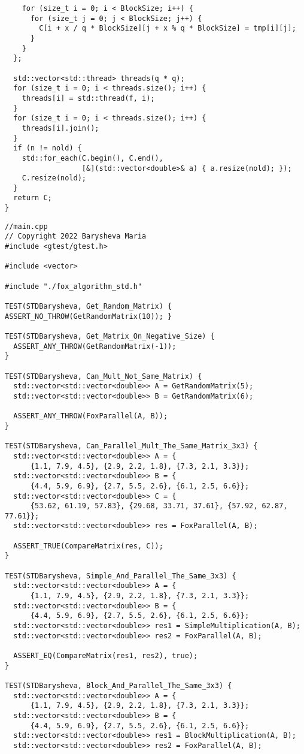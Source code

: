 \documentclass[12pt]{article}
\begin{document}
\begin{lstlisting}
    for (size_t i = 0; i < BlockSize; i++) {
      for (size_t j = 0; j < BlockSize; j++) {
        C[i + x / q * BlockSize][j + x % q * BlockSize] = tmp[i][j];
      }
    }
  };

  std::vector<std::thread> threads(q * q);
  for (size_t i = 0; i < threads.size(); i++) {
    threads[i] = std::thread(f, i);
  }
  for (size_t i = 0; i < threads.size(); i++) {
    threads[i].join();
  }
  if (n != nold) {
    std::for_each(C.begin(), C.end(),
                  [&](std::vector<double>& a) { a.resize(nold); });
    C.resize(nold);
  }
  return C;
}
\end{lstlisting}
\begin{lstlisting}
//main.cpp
// Copyright 2022 Barysheva Maria
#include <gtest/gtest.h>

#include <vector>

#include "./fox_algorithm_std.h"

TEST(STDBarysheva, Get_Random_Matrix) { ASSERT_NO_THROW(GetRandomMatrix(10)); }

TEST(STDBarysheva, Get_Matrix_On_Negative_Size) {
  ASSERT_ANY_THROW(GetRandomMatrix(-1));
}

TEST(STDBarysheva, Can_Mult_Not_Same_Matrix) {
  std::vector<std::vector<double>> A = GetRandomMatrix(5);
  std::vector<std::vector<double>> B = GetRandomMatrix(6);

  ASSERT_ANY_THROW(FoxParallel(A, B));
}

TEST(STDBarysheva, Can_Parallel_Mult_The_Same_Matrix_3x3) {
  std::vector<std::vector<double>> A = {
      {1.1, 7.9, 4.5}, {2.9, 2.2, 1.8}, {7.3, 2.1, 3.3}};
  std::vector<std::vector<double>> B = {
      {4.4, 5.9, 6.9}, {2.7, 5.5, 2.6}, {6.1, 2.5, 6.6}};
  std::vector<std::vector<double>> C = {
      {53.62, 61.19, 57.83}, {29.68, 33.71, 37.61}, {57.92, 62.87, 77.61}};
  std::vector<std::vector<double>> res = FoxParallel(A, B);

  ASSERT_TRUE(CompareMatrix(res, C));
}

TEST(STDBarysheva, Simple_And_Parallel_The_Same_3x3) {
  std::vector<std::vector<double>> A = {
      {1.1, 7.9, 4.5}, {2.9, 2.2, 1.8}, {7.3, 2.1, 3.3}};
  std::vector<std::vector<double>> B = {
      {4.4, 5.9, 6.9}, {2.7, 5.5, 2.6}, {6.1, 2.5, 6.6}};
  std::vector<std::vector<double>> res1 = SimpleMultiplication(A, B);
  std::vector<std::vector<double>> res2 = FoxParallel(A, B);

  ASSERT_EQ(CompareMatrix(res1, res2), true);
}

TEST(STDBarysheva, Block_And_Parallel_The_Same_3x3) {
  std::vector<std::vector<double>> A = {
      {1.1, 7.9, 4.5}, {2.9, 2.2, 1.8}, {7.3, 2.1, 3.3}};
  std::vector<std::vector<double>> B = {
      {4.4, 5.9, 6.9}, {2.7, 5.5, 2.6}, {6.1, 2.5, 6.6}};
  std::vector<std::vector<double>> res1 = BlockMultiplication(A, B);
  std::vector<std::vector<double>> res2 = FoxParallel(A, B);


\end{lstlisting}
\end{document}
